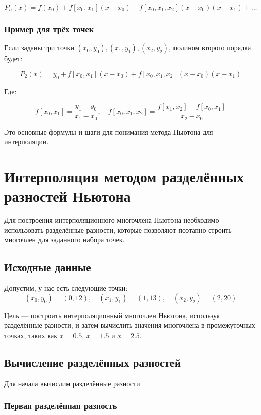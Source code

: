 \documentclass[a4paper,12pt]{article}
\begin{document}
\[
P_n(x) = f(x_0) + f[x_0, x_1](x - x_0) + f[x_0, x_1, x_2](x - x_0)(x - x_1) + \dots
\]

\subsubsection{Пример для трёх точек}

Если заданы три точки \( (x_0, y_0), (x_1, y_1), (x_2, y_2) \), полином второго порядка будет:

\[
P_2(x) = y_0 + f[x_0, x_1](x - x_0) + f[x_0, x_1, x_2](x - x_0)(x - x_1)
\]

Где:

\[
f[x_0, x_1] = \frac{y_1 - y_0}{x_1 - x_0}, \quad f[x_0, x_1, x_2] = \frac{f[x_1, x_2] - f[x_0, x_1]}{x_2 - x_0}
\]

Это основные формулы и шаги для понимания метода Ньютона для интерполяции.


\section*{Интерполяция методом разделённых разностей Ньютона}

Для построения интерполяционного многочлена Ньютона необходимо использовать разделённые разности, которые позволяют поэтапно строить многочлен для заданного набора точек.

\subsection*{Исходные данные}

Допустим, у нас есть следующие точки:
\[
(x_0, y_0) = (0, 12), \quad (x_1, y_1) = (1, 13), \quad (x_2, y_2) = (2, 20)
\]

Цель — построить интерполяционный многочлен Ньютона, используя разделённые разности, и затем вычислить значения многочлена в промежуточных точках, таких как $x = 0.5$, $x = 1.5$ и $x = 2.5$.

\subsection*{Вычисление разделённых разностей}

Для начала вычислим разделённые разности.

\subsubsection*{Первая разделённая разность}
\end{document}

